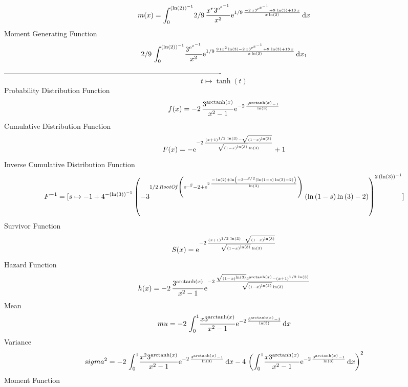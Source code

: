 \documentclass[12pt]{article}
\begin{document}
 $$ m(x) = \int_{0}^{ \left( \ln  \left( 2 \right)  \right) ^{-1}}\!2/9\,{\frac {
{x}^{r}{3}^{{{\rm e}^{{x}^{-1}}}}}{{x}^{2}}{{\rm e}^{1/9\,{\frac {-2\,
x{3}^{{{\rm e}^{{x}^{-1}}}}+9\,\ln  \left( 3 \right) +18\,x}{x\ln 
 \left( 3 \right) }}}}}\,{\rm d}x
$$ Moment Generating Function 
 $$2/9\,\int_{0}^{ \left( \ln  \left( 2 \right)  \right) ^{-1}}\!{\frac {
{3}^{{{\rm e}^{{x}^{-1}}}}}{{x}^{2}}{{\rm e}^{1/9\,{\frac {9\,t{x}^{2}
\ln  \left( 3 \right) -2\,x{3}^{{{\rm e}^{{x}^{-1}}}}+9\,\ln  \left( 3
 \right) +18\,x}{x\ln  \left( 3 \right) }}}}}\,{\rm d}x_{{1}}
$$-------------------------------------------------------------------------------------------  \\$$t\mapsto \tanh \left( t \right) 
$$Probability Distribution Function 
$$  f(x)=-2\,{\frac {{3}^{{\rm arctanh} \left(x\right)}}{{x}^{2}-1}{{\rm e}^{-2
\,{\frac {{3}^{{\rm arctanh} \left(x\right)}-1}{\ln  \left( 3 \right) 
}}}}}
$$Cumulative Distribution Function  
 $$F(x)=-{{\rm e}^{-2\,{\frac { \left( x+1 \right) ^{1/2\,\ln  \left( 3
 \right) }-\sqrt { \left( 1-x \right) ^{\ln  \left( 3 \right) }}}{
\sqrt { \left( 1-x \right) ^{\ln  \left( 3 \right) }}\ln  \left( 3
 \right) }}}}+1
$$ Inverse Cumulative Distribution Function 
  $$F^{-1} = [s\mapsto -1+{4}^{- \left( \ln  \left( 3 \right)  \right) ^{-1}}
 \left( -{3}^{1/2\,{\it RootOf} \left( {{\rm e}^{{\it \_Z}}}-2+{
{\rm e}^{2\,{\frac {-\ln  \left( 2 \right) +\ln  \left( -{3}^{{\it \_Z
}/2} \left( \ln  \left( 1-s \right) \ln  \left( 3 \right) -2 \right) 
 \right) }{\ln  \left( 3 \right) }}}} \right) } \left( \ln  \left( 1-s
 \right) \ln  \left( 3 \right) -2 \right)  \right) ^{2\, \left( \ln 
 \left( 3 \right)  \right) ^{-1}}]
$$Survivor Function 
 $$ S(x)={{\rm e}^{-2\,{\frac { \left( x+1 \right) ^{1/2\,\ln  \left( 3
 \right) }-\sqrt { \left( 1-x \right) ^{\ln  \left( 3 \right) }}}{
\sqrt { \left( 1-x \right) ^{\ln  \left( 3 \right) }}\ln  \left( 3
 \right) }}}}
$$ Hazard Function 
 $$ h(x)=-2\,{\frac {{3}^{{\rm arctanh} \left(x\right)}}{{x}^{2}-1}{{\rm e}^{-2
\,{\frac {\sqrt { \left( 1-x \right) ^{\ln  \left( 3 \right) }}{3}^{
{\rm arctanh} \left(x\right)}- \left( x+1 \right) ^{1/2\,\ln  \left( 3
 \right) }}{\sqrt { \left( 1-x \right) ^{\ln  \left( 3 \right) }}\ln 
 \left( 3 \right) }}}}}
$$Mean 
 $$ mu=-2\,\int_{0}^{1}\!{\frac {x{3}^{{\rm arctanh} \left(x\right)}}{{x}^{2}
-1}{{\rm e}^{-2\,{\frac {{3}^{{\rm arctanh} \left(x\right)}-1}{\ln 
 \left( 3 \right) }}}}}\,{\rm d}x
$$ Variance 
 $$ sigma^2 = -2\,\int_{0}^{1}\!{\frac {{x}^{2}{3}^{{\rm arctanh} \left(x\right)}}{{
x}^{2}-1}{{\rm e}^{-2\,{\frac {{3}^{{\rm arctanh} \left(x\right)}-1}{
\ln  \left( 3 \right) }}}}}\,{\rm d}x-4\, \left( \int_{0}^{1}\!{\frac 
{x{3}^{{\rm arctanh} \left(x\right)}}{{x}^{2}-1}{{\rm e}^{-2\,{\frac {
{3}^{{\rm arctanh} \left(x\right)}-1}{\ln  \left( 3 \right) }}}}}
\,{\rm d}x \right) ^{2}
$$Moment Function 
\end{document}
